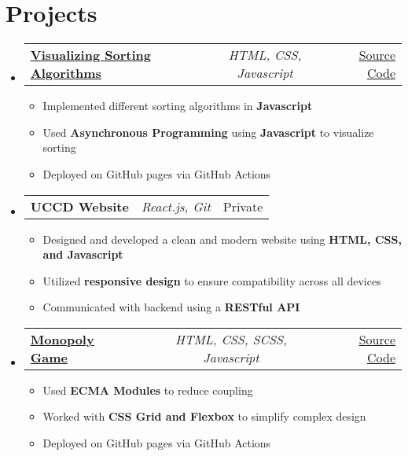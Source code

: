 \documentclass[a4paper,11pt]{article}
\makeatletter
\newcommand{\resumeItem}[1]{
  \item\small{#1}
}
\newcommand{\resumeItemListStart}{\begin{itemize}[rightmargin=0.11in]}
\newcommand{\resumeItemListEnd}{\end{itemize}}
\newcommand{\resumeTrioHeading}[3]{
  \item\small{
    \begin{tabular*}{0.96\textwidth}[t]{
      l@{\extracolsep{\fill}}c@{\extracolsep{\fill}}r
    }
      \textbf{#1} & \textit{#2} & #3
    \end{tabular*}
  }
}
\newcommand{\resumeHeadingListStart}{
  \begin{itemize}[leftmargin=0.15in, label={}]
}
\newcommand{\resumeHeadingListEnd}{\end{itemize}}
\makeatother
\begin{document}
\section{Projects}
  \resumeHeadingListStart{}
    \resumeTrioHeading{\href{https://mohammed4mach.github.io/visual-sort-alg}{\uline{Visualizing Sorting Algorithms}}}{HTML, CSS, Javascript}{\href{https://github.com/Mohammed4mach/visual-sort-alg}{\uline{Source Code}}}
      \resumeItemListStart{}
        \resumeItem{Implemented different sorting algorithms in \textbf{Javascript}}
        \resumeItem{Used \textbf{Asynchronous Programming} using \textbf{Javascript} to visualize sorting}
        \resumeItem{Deployed on GitHub pages via GitHub Actions}
      \resumeItemListEnd{}

    \resumeTrioHeading{UCCD Website}{React.js, Git}{Private}
      \resumeItemListStart{}
        \resumeItem{Designed and developed a clean and modern website using \textbf{HTML, CSS, and Javascript}}
        \resumeItem{Utilized \textbf{responsive design} to ensure compatibility across all devices}
        \resumeItem{Communicated with backend using a \textbf{RESTful API}}
      \resumeItemListEnd{}

    \resumeTrioHeading{\href{https://mohammed4mach.github.io/Monopoly-game/}{\uline{Monopoly Game}}}{HTML, CSS, SCSS, Javascript}{\href{https://github.com/Mohammed4mach/Monopoly-game}{\uline{Source Code}}}
      \resumeItemListStart{}
        \resumeItem{Used \textbf{ECMA Modules} to reduce coupling}
        \resumeItem{Worked with \textbf{CSS Grid and Flexbox} to simplify complex design}
        \resumeItem{Deployed on GitHub pages via GitHub Actions}
      \resumeItemListEnd{}
  \resumeHeadingListEnd{}



\end{document}
